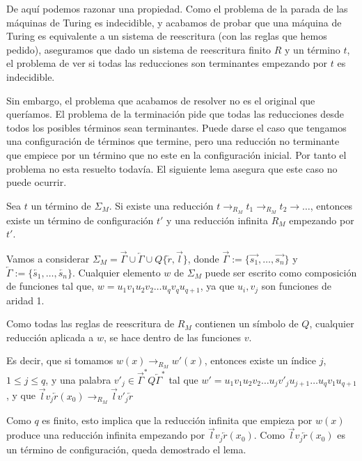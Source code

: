De aquí podemos razonar una propiedad. Como el problema de la parada
de las máquinas de Turing es indecidible, y acabamos de probar que una
máquina de Turing es equivalente a un sistema de reescritura (con las
reglas que hemos pedido), aseguramos que dado un sistema de
reescritura finito $R$ y un término $t$, el problema de ver si todas
las reducciones son terminantes empezando por $t$ es indecidible.

Sin embargo, el problema que acabamos de resolver no es el original
que queríamos. El problema de la terminación pide que todas las
reducciones desde todos los posibles términos sean terminantes. Puede
darse el caso que tengamos una configuración de términos que termine,
pero una reducción no terminante que empiece por un término que no
este en la configuración inicial. Por tanto el problema no esta
resuelto todavía. El siguiente lema asegura que este caso no puede
ocurrir.

\begin{lema} \label{lema:4.1}
  Sea  $t$  un  término  de   $\Sigma_M$.   Si  existe  una  reducción
  $t \rightarrow_{R_M}  t_1 \rightarrow_{R_M} t_2  \rightarrow \dots$,
  entonces existe  un término  de configuración  $t'$ y  una reducción
  infinita $R_M$ empezando por $t'$.
\end{lema}

\begin{demo}
  Vamos a considerar
  $\Sigma_M = \overrightarrow{\Gamma} \cup \overleftarrow{\Gamma} \cup
  Q \{ \overleftarrow{r} , \overrightarrow{l} \} $, donde
  $\overrightarrow{\Gamma} := \{\overrightarrow{s_1}, \dots,
  \overrightarrow{s_n} \}$ y
  $\overleftarrow{\Gamma} := \{ \overleftarrow{s_1}, \dots,
  \overleftarrow{s_n} \}$. Cualquier elemento $w$ de $\Sigma_M$ puede
  ser escrito como composición de funciones tal que,
  $w = u_1 v_1 u_2 v_2 \dots u_q v_q u_{q+1}$, ya que $u_i, v_j$ son
  funciones de aridad 1.

  Como todas las reglas de reescritura de $R_M$ contienen un símbolo
  de $Q$, cualquier reducción aplicada a $w$, se hace dentro de las
  funciones $v$.

  Es decir, que si tomamos $w(x) \rightarrow_{R_M} w'(x)$, entonces
  existe un índice $j$, $1 \leq j \leq q$, y una palabra
  $v'_j \in \overrightarrow{\Gamma}^{*} Q \overleftarrow{\Gamma}^{*}$
  tal que
  $w'= u_1 v_1 u_2 v_2 \dots u_j v'_j u_{j+1} \dots u_q v_1 u_{q+1}$,
  y que
  $\overrightarrow{l} v_j \overleftarrow{r} (x_0) \rightarrow_{R_M}
  \overrightarrow{l} v'_j \overleftarrow{r}$
  
  Como $q$ es finito, esto implica que la reducción infinita que
  empieza por $w(x)$ produce una reducción infinita empezando por
  $\overrightarrow{l} v_j \overleftarrow{r} (x_0)$. Como
  $\overrightarrow{l} v_j \overleftarrow{r} (x_0)$ es un término de
  configuración, queda demostrado el lema.
\end{demo}

